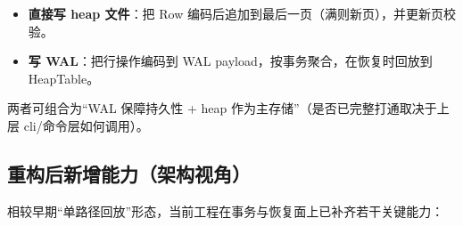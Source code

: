 \begin{itemize}
  \item \textbf{直接写 heap 文件}：把 Row 编码后追加到最后一页（满则新页），并更新页校验。
  \item \textbf{写 WAL}：把行操作编码到 WAL payload，按事务聚合，在恢复时回放到 HeapTable。
\end{itemize}

两者可组合为“WAL 保障持久性 + heap 作为主存储”（是否已完整打通取决于上层 cli/命令层如何调用）。

\subsection{重构后新增能力（架构视角）}

相较早期“单路径回放”形态，当前工程在事务与恢复面上已补齐若干关键能力：

